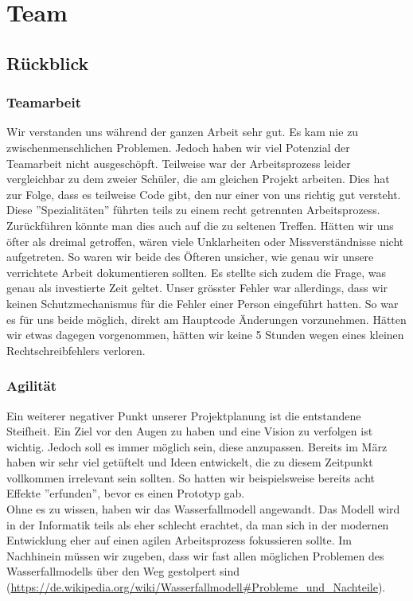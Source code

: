 \chapter{Team}

\section{Rückblick}

\subsection*{Teamarbeit}
Wir verstanden uns während der ganzen Arbeit sehr gut. Es kam nie zu zwischenmenschlichen Problemen. Jedoch haben wir viel Potenzial der Teamarbeit nicht ausgeschöpft.
Teilweise war der Arbeitsprozess leider vergleichbar zu dem zweier Schüler, die am gleichen Projekt arbeiten. Dies hat zur Folge, dass es teilweise Code gibt,
den nur einer von uns richtig gut versteht. Diese ''Spezialitäten'' führten teils zu einem recht getrennten Arbeitsprozess. Zurückführen könnte man dies auch auf die zu seltenen
Treffen. Hätten wir uns öfter als dreimal getroffen, wären viele Unklarheiten oder Missverständnisse nicht aufgetreten. So waren wir beide des Öfteren unsicher, wie genau wir unsere verrichtete Arbeit
dokumentieren sollten. Es stellte sich zudem die Frage, was genau als investierte Zeit geltet.
Unser grösster Fehler war allerdings, dass wir keinen Schutzmechanismus für die Fehler einer Person eingeführt hatten. So war es für uns beide möglich, direkt am Hauptcode Änderungen vorzunehmen.
Hätten wir etwas dagegen vorgenommen, hätten wir keine 5 Stunden wegen eines kleinen Rechtschreibfehlers verloren.


\subsection*{Agilität}
Ein weiterer negativer Punkt unserer Projektplanung ist die entstandene Steifheit. Ein Ziel vor den Augen zu haben und eine Vision zu verfolgen ist wichtig. Jedoch soll es
immer möglich sein, diese anzupassen. Bereits im März haben wir sehr viel getüftelt und Ideen entwickelt, die zu diesem Zeitpunkt vollkommen irrelevant sein sollten.
So hatten wir beispielsweise bereits acht Effekte ''erfunden'', bevor es einen Prototyp gab.\\
Ohne es zu wissen, haben wir das Wasserfallmodell angewandt. Das Modell wird in der Informatik teils als eher schlecht erachtet, da man sich in der modernen
Entwicklung eher auf einen agilen Arbeitsprozess fokussieren sollte. Im Nachhinein müssen wir zugeben, dass wir fast allen möglichen Problemen des Wasserfallmodells
über den Weg gestolpert sind (\url{https://de.wikipedia.org/wiki/Wasserfallmodell#Probleme_und_Nachteile}).


